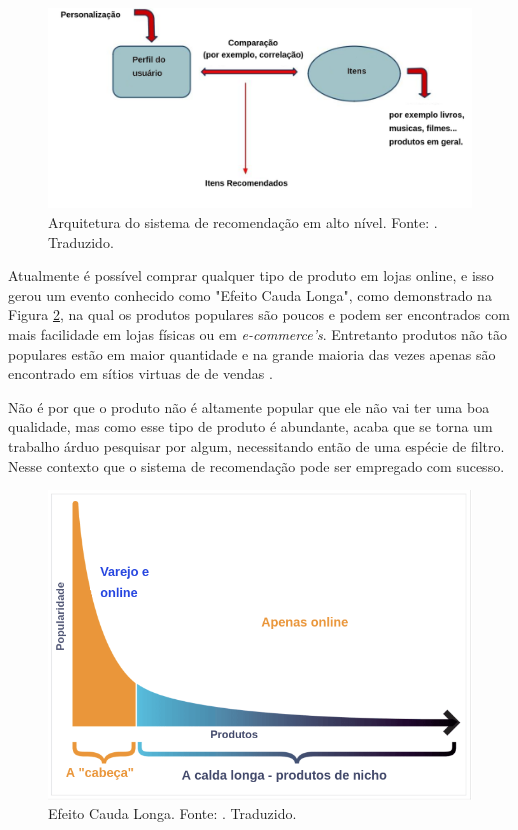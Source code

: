 \begin{figure}[H]
    \centering
    \includegraphics[scale=0.35]{figuras/referencial_teorico/sr_arquitetura.png}
    \caption[Arquitetura do sistema de recomendação em alto nível]{Arquitetura do sistema de recomendação em alto nível. Fonte: \cite{Stefanos:2008}. Traduzido.}
    \label{fig:sr_arquitetura}
\end{figure}

Atualmente é possível comprar qualquer tipo de produto em lojas online, e isso gerou um evento conhecido como "Efeito Cauda Longa", como demonstrado na Figura \ref{fig:efeito_cauda}, na qual os produtos populares são poucos e podem ser encontrados com mais facilidade em lojas físicas ou em \textit{e-commerce’s}. Entretanto produtos não tão populares estão em maior quantidade e na grande maioria das vezes apenas são encontrado em sítios virtuas de de vendas \cite{pandey:2019}.

Não é por que o produto não é altamente popular que ele não vai ter uma boa qualidade, mas como esse tipo de produto é abundante, acaba que se torna um trabalho árduo pesquisar por algum, necessitando então de uma espécie de filtro. Nesse contexto que o sistema de recomendação pode ser empregado com sucesso.

\begin{figure}[H]
    \centering
    \includegraphics[scale=0.35]{figuras/referencial_teorico/efeito_cauda.png}
    \caption[Efeito Cauda Longa]{Efeito Cauda Longa. Fonte: \cite{pandey:2019}. Traduzido.}
    \label{fig:efeito_cauda}
\end{figure}

